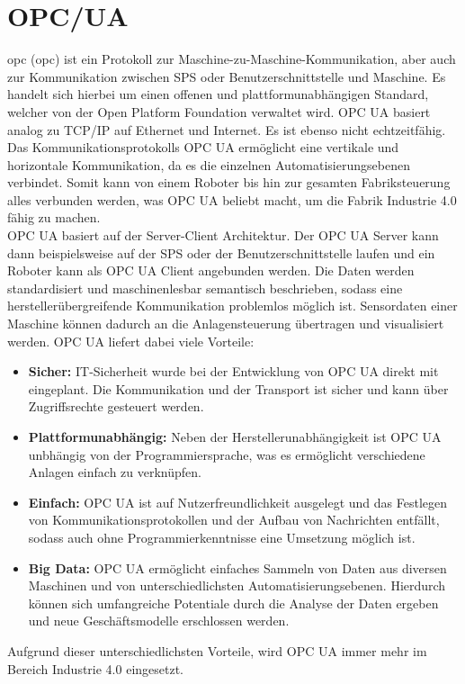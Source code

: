 \documentclass[ a4paper,
                oneside,
                toc=bibliography,
                toc=listof
                ]{scrbook}
\begin{document}
   	\section{OPC/UA}
   	\acs{opc} (\acl{opc}) ist ein Protokoll zur Maschine-zu-Maschine-Kommunikation, aber auch zur Kommunikation zwischen SPS oder Benutzerschnittstelle und Maschine. Es handelt sich hierbei um einen offenen und plattformunabhängigen Standard, welcher von der \glqq Open Platform Foundation\grqq{} verwaltet wird. OPC UA basiert analog zu TCP/IP auf Ethernet und Internet. Es ist ebenso nicht echtzeitfähig. Das Kommunikationsprotokolls OPC UA ermöglicht eine vertikale und horizontale Kommunikation, da es die einzelnen Automatisierungsebenen verbindet. Somit kann von einem Roboter bis hin zur gesamten Fabriksteuerung alles verbunden werden, was OPC UA beliebt macht, um die Fabrik \glqq Industrie 4.0\grqq{} fähig zu machen. \cite{industrie40} \\
   	OPC UA basiert auf der Server-Client Architektur. Der OPC UA Server kann dann beispielsweise auf der SPS oder der Benutzerschnittstelle laufen und ein Roboter kann als OPC UA Client angebunden werden. Die Daten werden standardisiert und maschinenlesbar semantisch beschrieben, sodass eine herstellerübergreifende Kommunikation problemlos möglich ist. Sensordaten einer Maschine können dadurch an die Anlagensteuerung übertragen und visualisiert werden. OPC UA liefert dabei viele Vorteile: \cite{OPCUA}
   	\begin{itemize}
   		\item \textbf{Sicher:} IT-Sicherheit wurde bei der Entwicklung von OPC UA direkt mit eingeplant. Die Kommunikation und der Transport ist sicher und kann über Zugriffsrechte gesteuert werden.
   		\item \textbf{Plattformunabhängig:} Neben der Herstellerunabhängigkeit ist OPC UA unbhängig von der Programmiersprache, was es ermöglicht verschiedene Anlagen einfach zu verknüpfen.
   		\item \textbf{Einfach:} OPC UA ist auf Nutzerfreundlichkeit ausgelegt und das Festlegen von Kommunikationsprotokollen und der Aufbau von Nachrichten entfällt, sodass auch ohne Programmierkenntnisse eine Umsetzung möglich ist. 
   		\item \textbf{Big Data:} OPC UA ermöglicht einfaches Sammeln von Daten aus diversen Maschinen und von unterschiedlichsten Automatisierungsebenen. Hierdurch können sich umfangreiche Potentiale durch die Analyse der Daten ergeben und neue Geschäftsmodelle erschlossen werden. \\
   	\end{itemize}
   	Aufgrund dieser unterschiedlichsten Vorteile, wird OPC UA immer mehr im Bereich Industrie 4.0 eingesetzt. \cite{OPCUA}  \cite{industrie40}
   	
\end{document}

